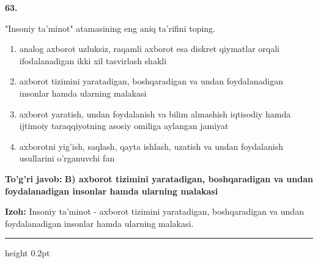 \documentclass[10pt,a4paper,oneside]{article}
\begin{document}
\noindent\textbf{\color{ink}63.}
\par
"Insoniy ta'minot" atamasining eng aniq ta'rifini toping.
\begin{enumerate}[label=\Alph*),leftmargin=9mm]
\item analog axborot uzluksiz, raqamli axborot esa diskret qiymatlar orqali ifodalanadigan ikki xil tasvirlash shakli
\item axborot tizimini yaratadigan, boshqaradigan va undan foydalanadigan insonlar hamda ularning malakasi
\item axborot yaratish, undan foydalanish va bilim almashish iqtisodiy hamda ijtimoiy taraqqiyotning asosiy omiliga aylangan jamiyat
\item axborotni yig'ish, saqlash, qayta ishlash, uzatish va undan foydalanish usullarini o'rganuvchi fan
\end{enumerate}
\begin{tcolorbox}[enhanced,breakable,colback=teal!4,colframe=teal!50!black,boxrule=0.5pt,arc=1.1mm,left=3mm,right=3mm,top=1.7mm,bottom=1.7mm,before skip=2mm,after skip=2mm]
\textbf{\color{teal}To'g'ri javob:} \textbf{B) axborot tizimini yaratadigan, boshqaradigan va undan foydalanadigan insonlar hamda ularning malakasi}
\par\smallskip
\textbf{Izoh:} Insoniy ta'minot - axborot tizimini yaratadigan, boshqaradigan va undan foydalanadigan insonlar hamda ularning malakasi.
\end{tcolorbox}
\vspace{2mm}\hrule height 0.2pt \vspace{3mm}
\end{document}
